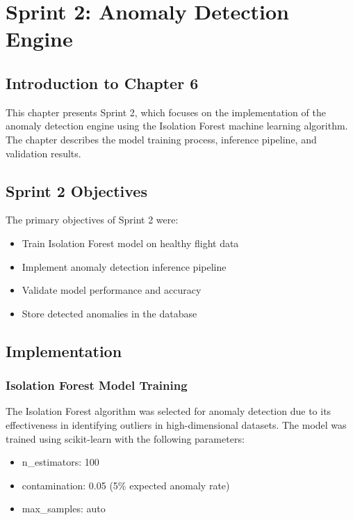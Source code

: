 \chapter{Sprint 2: Anomaly Detection Engine}

\section*{Introduction to Chapter 6}

This chapter presents Sprint 2, which focuses on the implementation of the anomaly detection engine using the Isolation Forest machine learning algorithm. The chapter describes the model training process, inference pipeline, and validation results.

\section{Sprint 2 Objectives}

The primary objectives of Sprint 2 were:
\begin{itemize}
    \item Train Isolation Forest model on healthy flight data
    \item Implement anomaly detection inference pipeline
    \item Validate model performance and accuracy
    \item Store detected anomalies in the database
\end{itemize}

\section{Implementation}

\subsection{Isolation Forest Model Training}

The Isolation Forest algorithm was selected for anomaly detection due to its effectiveness in identifying outliers in high-dimensional datasets. The model was trained using scikit-learn with the following parameters:
\begin{itemize}
    \item n_estimators: 100
    \item contamination: 0.05 (5\% expected anomaly rate)
    \item max_samples: auto
\end{itemize}

